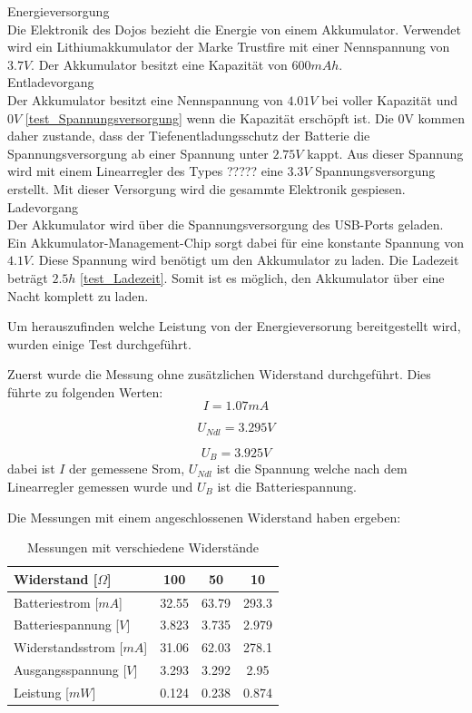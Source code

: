 Energieversorgung\\
Die Elektronik des Dojos bezieht die Energie von einem Akkumulator. Verwendet wird ein Lithiumakkumulator der Marke Trustfire mit einer Nennspannung von $3.7V$. Der Akkumulator besitzt eine Kapazität von $600mAh$.\\

Entladevorgang\\ 
Der Akkumulator besitzt eine Nennspannung von $4.01V$ bei voller Kapazität und $0V$ \ref{test_Spannungsversorgung} wenn die Kapazität erschöpft ist. Die 0V kommen daher zustande, dass der Tiefenentladungsschutz der Batterie die Spannungsversorgung ab einer Spannung unter $2.75V$ kappt. Aus dieser Spannung wird mit einem Linearregler des Types ????? eine $3.3V$ Spannungsversorgung erstellt. Mit dieser Versorgung wird die gesammte Elektronik gespiesen.\\

Ladevorgang\\
Der Akkumulator wird über die Spannungsversorgung des USB-Ports geladen. Ein Akkumulator-Management-Chip sorgt dabei für eine konstante Spannung von $4.1V$. Diese Spannung wird benötigt um den Akkumulator zu laden. Die Ladezeit beträgt $2.5h$ \ref{test_Ladezeit}. Somit ist es möglich, den Akkumulator über eine Nacht komplett zu laden. 


Um herauszufinden welche Leistung von der Energieversorung bereitgestellt wird, wurden einige Test durchgeführt.

Zuerst wurde die Messung ohne zusätzlichen Widerstand durchgeführt. Dies führte zu folgenden Werten:
\begin{equation}
I = 1.07mA
\end{equation}

\begin{equation}
U_{Ndl} = 3.295V
\end{equation}

\begin{equation}
U_{B} = 3.925V
\end{equation}
dabei ist $I$ der gemessene Srom, $U_{Ndl}$ ist die Spannung welche nach dem Linearregler gemessen wurde und $U_{B}$ ist die Batteriespannung.

Die Messungen mit einem angeschlossenen Widerstand haben ergeben: \\

\begin{table}[hp]
\centering
\label{messungen_Energie}
\begin{tabular}{|l|c|c|c|}
\hline
Widerstand [$\Omega$]     & 100   & 50    & 10    \\ \hline
Batteriestrom [$mA$]    & 32.55 & 63.79 & 293.3 \\ \hline
Batteriespannung [$V$] & 3.823 & 3.735 & 2.979 \\ \hline
Widerstandsstrom [$mA$] & 31.06 & 62.03 & 278.1 \\ \hline
Ausgangsspannung [$V$]  & 3.293 & 3.292 & 2.95  \\ \hline
Leistung [$mW$]  & 0.124 & 0.238 & 0.874  \\ \hline
\end{tabular}
\caption{Messungen mit verschiedene Widerstände}
\end{table}

